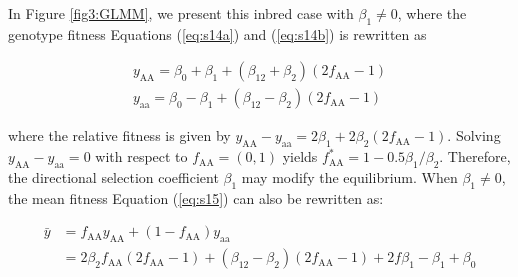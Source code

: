 \documentclass[12pt,]{article}
\begin{document}
In Figure \ref{fig3:GLMM}, we present this inbred case with $\beta_1 \neq 0$, where the genotype fitness Equations (\ref{eq:s14a}) and (\ref{eq:s14b}) is rewritten as

\begin{subequations}
\begin{align}
    y_\mathrm{AA} = \beta_0 + \beta_1 + (\beta_{12}+\beta_2)(2f_\mathrm{AA}-1) \label{eq:s16a} \\
    y_\mathrm{aa} = \beta_0 - \beta_1 + (\beta_{12}-\beta_2)(2f_\mathrm{AA}-1) \label{eq:s16b}
\end{align}
\end{subequations}

\noindent
where the relative fitness is given by $y_\mathrm{AA} - y_\mathrm{aa} = 2\beta_1 + 2\beta_2(2f_\mathrm{AA}-1)$. Solving $y_\mathrm{AA} - y_\mathrm{aa} = 0$ with respect to $f_\mathrm{AA} = (0,1)$ yields $f^*_\mathrm{AA} = 1 - 0.5\beta_1 / \beta_2$. Therefore, the directional selection coefficient $\beta_1$ may modify the equilibrium. When $\beta_1 \neq 0$, the mean fitness Equation (\ref{eq:s15}) can also be rewritten as:

\begin{equation}
\begin{split}
\bar{y} &= f_\mathrm{AA}y_\mathrm{AA} + (1-f_\mathrm{AA})y_\mathrm{aa} \\
&= 2\beta_{2}f_\mathrm{AA}(2f_\mathrm{AA}-1) + (\beta_{12}-\beta_2)(2f_\mathrm{AA}-1) + 2f\beta_1 - \beta_1 + \beta_0 \label{eq:s16}
\end{split}
\end{equation}
\end{document}
